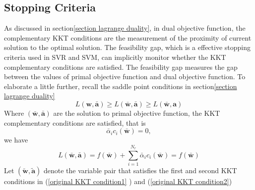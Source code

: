 \documentclass[12pt, draftclsnofoot, onecolumn]{IEEEtran}
\begin{document}
\begin{spacing}{2}
\section{Stopping Criteria}\label{stopping criteria}
As discussed in section\ref{section lagrange duality}, in dual objective function, the complementary KKT conditions are the measurement of the proximity of current solution to the optimal solution. 
The feasibility gap, which is a effective stopping criteria used in SVR and SVM, can implicitly monitor whether the KKT complementary conditions are satisfied. The feasibility gap measures the gap between the values of primal objective function and dual objective function. To elaborate a little further, recall the saddle point conditions in section\ref{section lagrange duality}
 \begin{equation}
 L(\mathbf{w}, \bar{\mathbf{a}})\geq L(\bar{\mathbf{w}}, \bar{\mathbf{a}})\geq L(\bar{\mathbf{w}}, \mathbf{a})
 \label{saddle point conditions}
 \end{equation}
Where $(\bar{\mathbf{w}}, \bar{\mathbf{a}})$ are the solution to primal objective function, the KKT complementary conditions are satisfied, that is 
\begin{equation}
\bar{\alpha}_{i}c_{i}(\bar{\mathbf{w}})=0,
\label{complementary KKT condition revisited}
\end{equation}
we have 
\begin{equation}
L(\bar{\mathbf{w}}, \bar{\mathbf{a}})=f(\bar{\mathbf{w}})+\sum_{i=1}^{N_{r}}\bar{\alpha}_{i}c_{i}(\bar{\mathbf{w}})=f(\bar{\mathbf{w}})
\end{equation} 
Let $(\tilde{\mathbf{w}}, \tilde{\mathbf{a}})$ denote the variable pair that satisfies the first and second KKT conditions in (\ref{original KKT condition1} ) and (\ref{original KKT condition2})


\end{spacing}
\end{document}
